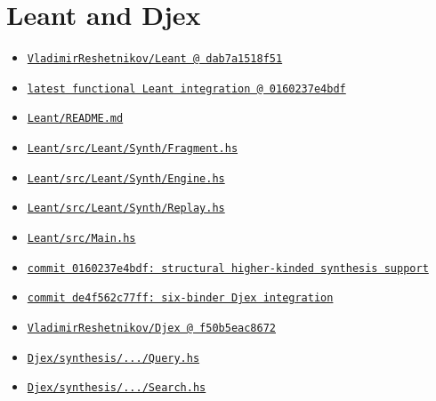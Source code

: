 \documentclass[11pt,letterpaper,openany]{report}
\newcommand{\sourcelink}[2]{\href{#1}{\nolinkurl{#2}}}
\begin{document}
\section*{Leant and Djex}

\begin{itemize}
  \item \sourcelink{https://github.com/VladimirReshetnikov/Leant/tree/dab7a1518f51faf5e71cb71142c5c4df3904774e}{VladimirReshetnikov/Leant @ dab7a1518f51}
  \item \sourcelink{https://github.com/VladimirReshetnikov/Leant/tree/0160237e4bdf6e342a55f5a86ce5d5292728024f}{latest functional Leant integration @ 0160237e4bdf}
  \item \sourcelink{https://github.com/VladimirReshetnikov/Leant/blob/0160237e4bdf6e342a55f5a86ce5d5292728024f/README.md}{Leant/README.md}
  \item \sourcelink{https://github.com/VladimirReshetnikov/Leant/blob/0160237e4bdf6e342a55f5a86ce5d5292728024f/src/Leant/Synth/Fragment.hs}{Leant/src/Leant/Synth/Fragment.hs}
  \item \sourcelink{https://github.com/VladimirReshetnikov/Leant/blob/0160237e4bdf6e342a55f5a86ce5d5292728024f/src/Leant/Synth/Engine.hs}{Leant/src/Leant/Synth/Engine.hs}
  \item \sourcelink{https://github.com/VladimirReshetnikov/Leant/blob/0160237e4bdf6e342a55f5a86ce5d5292728024f/src/Leant/Synth/Replay.hs}{Leant/src/Leant/Synth/Replay.hs}
  \item \sourcelink{https://github.com/VladimirReshetnikov/Leant/blob/0160237e4bdf6e342a55f5a86ce5d5292728024f/src/Main.hs}{Leant/src/Main.hs}
  \item \sourcelink{https://github.com/VladimirReshetnikov/Leant/commit/0160237e4bdf6e342a55f5a86ce5d5292728024f}{commit 0160237e4bdf: structural higher-kinded synthesis support}
  \item \sourcelink{https://github.com/VladimirReshetnikov/Leant/commit/de4f562c77ffa339f97670058dde693119d76345}{commit de4f562c77ff: six-binder Djex integration}
  \item \sourcelink{https://github.com/VladimirReshetnikov/Djex/tree/f50b5eac86726c7530d95e48c27101b7c0fa25c9}{VladimirReshetnikov/Djex @ f50b5eac8672}
  \item \sourcelink{https://github.com/VladimirReshetnikov/Djex/blob/f50b5eac86726c7530d95e48c27101b7c0fa25c9/synthesis/src/Language/Haskell/Synthesis/Query.hs}{Djex/synthesis/.../Query.hs}
  \item \sourcelink{https://github.com/VladimirReshetnikov/Djex/blob/f50b5eac86726c7530d95e48c27101b7c0fa25c9/synthesis/src/Language/Haskell/Synthesis/Search.hs}{Djex/synthesis/.../Search.hs}

\end{itemize}
\end{document}
